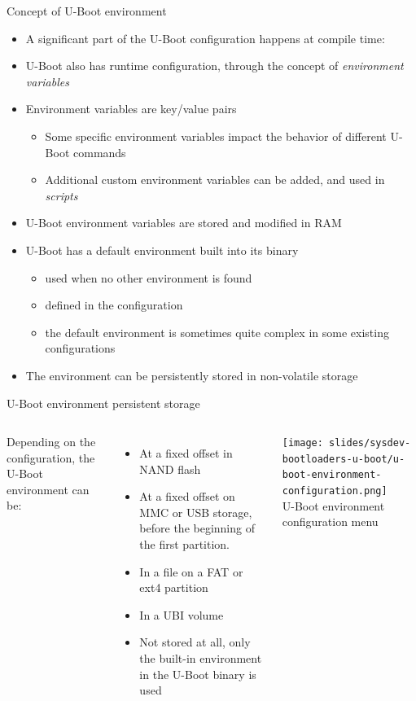 \begin{frame}{Concept of U-Boot environment}
  \begin{itemize}
  \item A significant part of the U-Boot configuration happens at
    compile time: 
  \item U-Boot also has runtime configuration, through the concept of
    {\em environment variables}
  \item Environment variables are key/value pairs
    \begin{itemize}
    \item Some specific environment variables impact the behavior of
      different U-Boot commands
    \item Additional custom environment variables can be added, and
      used in {\em scripts}
    \end{itemize}
  \item U-Boot environment variables are stored and modified in RAM
  \item U-Boot has a default environment built into its binary
    \begin{itemize}
    \item used when no other environment is found
    \item defined in the configuration
    \item the default environment is sometimes quite complex in some
      existing configurations
    \end{itemize}
  \item The environment can be persistently stored in non-volatile
    storage
  \end{itemize}
\end{frame}

\begin{frame}{U-Boot environment persistent storage}
  \begin{columns}
    Depending on the configuration, the U-Boot environment can be:
    \begin{itemize}
    \item At a fixed offset in NAND flash
    \item At a fixed offset on MMC or USB storage, before the
      beginning of the first partition.
    \item In a file on a FAT or ext4 partition
    \item In a UBI volume
    \item Not stored at all, only the built-in environment in the
      U-Boot binary is used
    \end{itemize}
    \texttt{[image: slides/sysdev-bootloaders-u-boot/u-boot-environment-configuration.png]}\\
    \vspace{0.3cm}
    \tiny U-Boot environment configuration menu
  \end{columns}
\end{frame}

